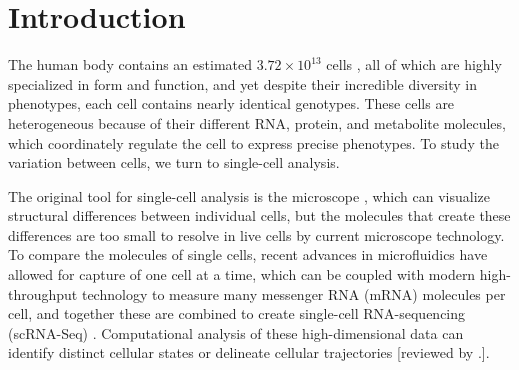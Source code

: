 






\section{Introduction}
The human body contains an estimated $3.72\times 10^{13}$ cells \parencite{Bianconi2013-jr}, all of which are highly specialized in form and function, and yet despite their incredible diversity in phenotypes, each cell contains nearly identical genotypes. These cells are heterogeneous because of their different RNA, protein, and metabolite molecules, which coordinately regulate the cell to express precise phenotypes. To study the variation between cells, we turn to single-cell analysis.

The original tool for single-cell analysis is the microscope \cite{Hooke1665-bk,Van_Leeuwenhoek_undated-gu}, which can visualize structural differences between individual cells, but the molecules that create these differences are too small to resolve in live cells by current microscope technology. To compare the molecules of single cells, recent advances in microfluidics have allowed for capture of one cell at a time, which can be coupled with modern high-throughput technology to measure many messenger RNA (mRNA) molecules per cell, and together these are combined to create single-cell RNA-sequencing (scRNA-Seq) \cite{Kolodziejczyk:2015dj,Ziegenhain:2017kr}. Computational analysis of these high-dimensional data can identify distinct cellular states or delineate cellular trajectories [reviewed by \cite{Bacher:2016jq,Cannoodt2016-mt,Liu:2016fd,Trapnell:2015er,Stegle:2015cx}.].

